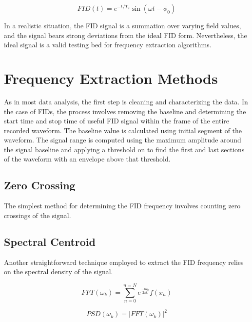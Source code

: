 \begin{equation}
FID(t) = e^{-t/T_2} \sin(\omega t - \phi_0)
\label{eqn:ideal-fid}
\end{equation}

\begin{figure}
\label{fig:ideal-fid}
\end{figure}

In a realistic situation, the FID signal is a summation over varying field values, and the signal bears strong deviations from the ideal FID form.  Nevertheless, the ideal signal is a valid testing bed for frequency extraction algorithms.

\section{Frequency Extraction Methods}

As in most data analysis, the first step is cleaning and characterizing the data.  In the case of FIDs, the process involves removing the baseline  and determining the start time and stop time of useful FID signal within the frame of the entire recorded waveform.  The baseline value is calculated using initial segment of the waveform.  The signal range is computed using the maximum amplitude around the signal baseline and applying a threshold on to find the first and last sections of the waveform with an envelope above that threshold.

\subsection{Zero Crossing}
The simplest method for determining the FID frequency involves counting zero crossings of the signal.  

\subsection{Spectral Centroid}
Another straightforward technique employed to extract the FID frequency relies on the spectral density of the signal. 

\begin{equation}
FFT(\omega_k) = \sum_{n=0}^{n=N} e^\frac{-i \omega_0}{2\pi k} f(x_n)
\label{eqn:fid-fft}
\end{equation}

\begin{equation}
PSD(\omega_k) = |FFT(\omega_k)|^2
\label{eqn:fid-psd}
\end{equation}

